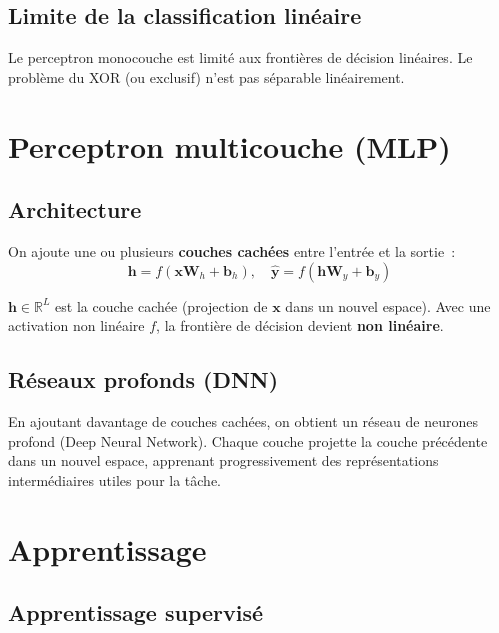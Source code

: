 \documentclass[a4paper,11pt]{article}
\theoremstyle{definition}
\theoremstyle{remark}
\begin{document}
\subsection{Limite de la classification lin\'eaire}

Le perceptron monocouche est limit\'e aux fronti\`eres de d\'ecision
lin\'eaires. Le probl\`eme du XOR (ou exclusif) n'est pas
s\'eparable lin\'eairement.

\section{Perceptron multicouche (MLP)}

\subsection{Architecture}

On ajoute une ou plusieurs \textbf{couches cach\'ees} entre
l'entr\'ee et la sortie~:
\begin{equation}
  \mathbf{h} = f(\mathbf{x} \mathbf{W}_h + \mathbf{b}_h),
  \quad \hat{\mathbf{y}} = f(\mathbf{h} \mathbf{W}_y +
  \mathbf{b}_y)
\end{equation}

\noindent $\mathbf{h} \in \mathbb{R}^L$ est la couche cach\'ee
(projection de $\mathbf{x}$ dans un nouvel espace). Avec une
activation non lin\'eaire $f$, la fronti\`ere de d\'ecision devient
\textbf{non lin\'eaire}.

\subsection{R\'eseaux profonds (DNN)}

En ajoutant davantage de couches cach\'ees, on obtient un r\'eseau
de neurones profond (Deep Neural Network). Chaque couche projette
la couche pr\'ec\'edente dans un nouvel espace, apprenant
progressivement des repr\'esentations interm\'ediaires utiles pour
la t\^ache.

\section{Apprentissage}

\subsection{Apprentissage supervis\'e}
\end{document}
